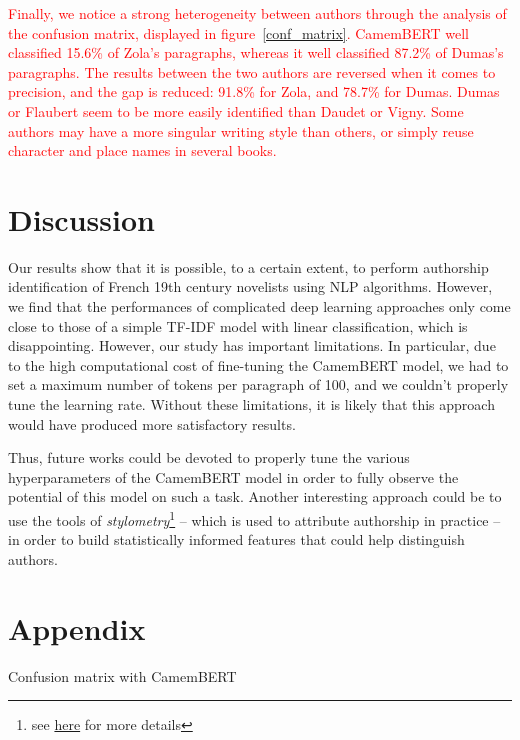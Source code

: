 \documentclass[11pt,a4paper]{article}
\begin{document}
\textcolor{red}{Finally, we notice a strong heterogeneity between authors through the analysis of the confusion matrix, displayed in figure~\ref{conf_matrix}. CamemBERT well classified 15.6\% of Zola's paragraphs, whereas it well classified 87.2\% of Dumas's paragraphs. The results between the two authors are reversed when it comes to precision, and the gap is reduced: 91.8\% for Zola, and 78.7\% for Dumas. Dumas or Flaubert seem to be more easily identified than Daudet or Vigny. Some authors may have a more singular writing style than others, or simply reuse character and place names in several books.}


\section{Discussion}

Our results show that it is possible, to a certain extent, to perform authorship identification of French 19th century novelists using NLP algorithms. However, we find that the performances of complicated deep learning approaches only come close  to those of a simple TF-IDF model with linear classification, which is disappointing. However, our study has important limitations. In particular, due to the high computational cost of fine-tuning the CamemBERT model, we had to set a maximum number of tokens per paragraph of 100, and we couldn't properly tune the learning rate. Without these limitations, it is likely that this approach would have produced more satisfactory results.

Thus, future works could be devoted to properly tune the various hyperparameters of the CamemBERT model in order to fully observe the potential of this model on such a task. Another interesting approach could be to use the tools of \textit{stylometry}\footnote{see \href{https://en.wikipedia.org/wiki/Stylometry}{here} for more details} -- which is used to attribute authorship in practice -- in order to build statistically informed features that could help distinguish authors.







\newpage





\section*{Appendix}

\begin{table}[h]
\caption{Confusion matrix with CamemBERT}
\label{conf_matrix}
\begin{center}

\end{center}
\end{table}
\end{document}
